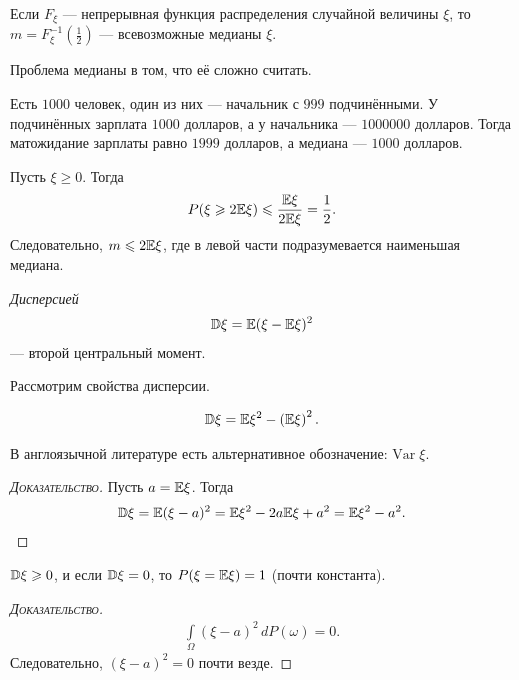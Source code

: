 \documentclass[../main.tex]{subfiles}
\begin{document}
\begin{remrk*}
 Если $ F_\xi $ --- непрерывная функция распределения случайной величины $ \xi $, то $ m = F_\xi^{-1}(\frac{1}{2}) $ --- всевозможные медианы $ \xi $.
\end{remrk*}

Проблема медианы в том, что её сложно считать.

\begin{exmpl*}
 Есть $ 1000 $ человек, один из них --- начальник с $ 999 $ подчинёнными. У подчинённых зарплата $ 1000 $ долларов, а у начальника --- $ 1000000 $ долларов. Тогда матожидание зарплаты равно $ 1999 $ долларов, а медиана --- $ 1000 $ долларов.
\end{exmpl*}

\begin{remrk}
 Пусть $ \xi \geqslant 0 $. Тогда
 \begin{align*}
  P(\xi \geqslant 2\mathbb E\xi) \leqslant \frac{\mathbb E\xi}{2\mathbb E\xi} = \frac{1}{2}.
 \end{align*} Следовательно, $ m \leqslant 2\mathbb E\xi $, где в левой части подразумевается наименьшая медиана.
\end{remrk}

\begin{df}[дисперсия]
 \textit{Дисперсией}
 \begin{align*}
  \mathbb D \xi = \mathbb E (\xi - \mathbb E\xi)^{2}
 \end{align*} --- второй центральный момент.
\end{df}

Рассмотрим свойства дисперсии.
\begin{prop}
 \begin{align*}
  \mathbb D\xi = \mathbb E \xi^{2} - \left( \mathbb E \xi \right)^{2}.
 \end{align*} 

 В англоязычной литературе есть альтернативное обозначение: $ \mathrm{Var} \;\xi $.
\end{prop}
\begin{proof}[\normalfont\textsc{Доказательство}]
 Пусть $a = \mathbb E\xi $. Тогда
 \begin{align*}
  \mathbb D\xi = \mathbb E(\xi - a)^{2} = \mathbb E\xi^{2} - 2a \mathbb E\xi + a^{2} = \mathbb E\xi^{2} - a^{2}.
 \end{align*} 
\end{proof}

\begin{prop}
 $ \mathbb D\xi \geqslant 0 $, и если $ \mathbb D\xi = 0 $, то $ P(\xi = \mathbb E\xi) = 1 $ (почти константа).
\end{prop}
\begin{proof}[\normalfont\textsc{Доказательство}]
 \begin{align*}
  \int\limits_{\Omega} (\xi - a)^{2} \,dP(\omega) = 0.
 \end{align*} Следовательно, $ (\xi - a)^{2} = 0 $ почти везде.
\end{proof}
\end{document}
